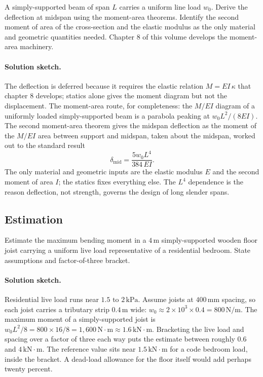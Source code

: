 \begin{exercise}
A simply-supported beam of span $L$ carries a uniform line load
$w_0$. Derive the deflection at midspan using the moment-area
theorems. Identify the second moment of area of the cross-section
and the elastic modulus as the only material and geometric
quantities needed. Chapter 8 of this volume develops the
moment-area machinery.

\paragraph{Solution sketch.} The deflection is deferred because it
requires the elastic relation $M = EI\, \kappa$ that chapter 8 develops;
statics alone gives the moment diagram but not the displacement. The
moment-area route, for completeness: the $M/EI$ diagram of a uniformly
loaded simply-supported beam is a parabola peaking at $w_0 L^2/(8EI)$.
The second moment-area theorem gives the midspan deflection as the
moment of the $M/EI$ area between support and midspan, taken about the
midspan, worked out to the standard result
\[
\delta_{\text{mid}} = \frac{5 w_0 L^4}{384\, EI}.
\]
The only material and geometric inputs are the elastic modulus $E$ and
the second moment of area $I$; the statics fixes everything else. The
$L^4$ dependence is the reason deflection, not strength, governs the
design of long slender spans.
\end{exercise}

\subsection*{Estimation}

\begin{exercise}
Estimate the maximum bending moment in a $4\,\si{\meter}$
simply-supported wooden floor joist carrying a uniform live load
representative of a residential bedroom. State assumptions and
factor-of-three bracket.

\paragraph{Solution sketch.} Residential live load runs near
$1.5\text{ to }2\,\text{kPa}$. Assume joists at $400\,\si{\milli\meter}$
spacing, so each joist carries a tributary strip $0.4\,\si{\meter}$
wide: $w_0 \approx 2 \times 10^{3} \times 0.4 = 800\,\text{N/m}$. The
maximum moment of a simply-supported joist is $w_0 L^2/8 =
800 \times 16 / 8 = 1{,}600\,\text{N}\cdot\text{m} \approx
1.6\,\text{kN}\cdot\text{m}$. Bracketing the live load and spacing over
a factor of three each way puts the estimate between roughly
$0.6$ and $4\,\text{kN}\cdot\text{m}$. The reference value sits near
$1.5\,\text{kN}\cdot\text{m}$ for a code bedroom load, inside the
bracket. A dead-load allowance for the floor itself would add perhaps
twenty percent.
\end{exercise}

